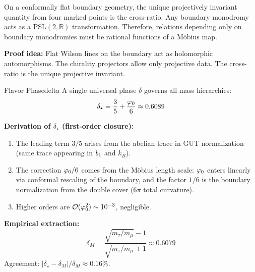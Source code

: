 \begin{tcolorbox}[colback=purple!3, colframe=purple!50!black, 
    title={\textbf{Lemma (Cross-Ratio from Boundary Monodromy)}}, fonttitle=\bfseries\small]
On a conformally flat boundary geometry, the unique projectively invariant quantity 
from four marked points is the cross-ratio. Any boundary monodromy acts as a 
PSL$(2,\mathbb{R})$ transformation. Therefore, relations depending only on boundary 
monodromies must be rational functions of a M\"obius map.

\textbf{Proof idea:} Flat Wilson lines on the boundary act as holomorphic automorphisms. 
The chirality projectors allow only projective data. The cross-ratio is the unique 
projective invariant.
\end{tcolorbox}

\begin{definition}{Flavor Phase}{delta}
A single universal phase $\delta$ governs all mass hierarchies:
\begin{equation}
    \delta_\star = \frac{3}{5} + \frac{\varphi_0}{6} \approx 0.6089
\end{equation}

\textbf{Derivation of $\delta_\star$ (first-order closure):}
\begin{enumerate}[leftmargin=1.5em, topsep=2pt, itemsep=1pt]
    \item The leading term $3/5$ arises from the abelian trace in GUT normalization 
        (same trace appearing in $b_1$ and $k_B$).
    \item The correction $\varphi_0/6$ comes from the M\"obius length scale: $\varphi_0$ 
        enters linearly via conformal rescaling of the boundary, and the factor 
        $1/6$ is the boundary normalization from the double cover ($6\pi$ total curvature).
    \item Higher orders are $\mathcal{O}(\varphi_0^2) \sim 10^{-3}$, negligible.
\end{enumerate}

\textbf{Empirical extraction:}
\begin{equation}
    \delta_M = \frac{\sqrt{m_\tau/m_\mu} - 1}{\sqrt{m_\tau/m_\mu} + 1} \approx 0.6079
\end{equation}
Agreement: $|\delta_\star - \delta_M| / \delta_M \approx 0.16\%$.
\end{definition}

